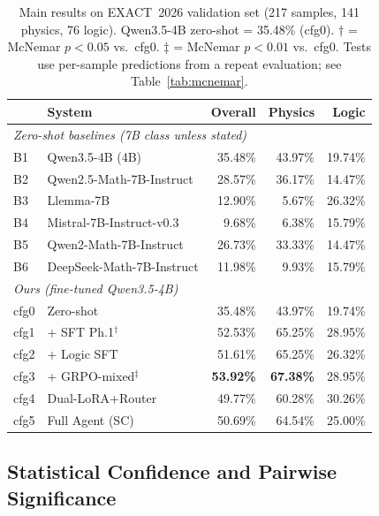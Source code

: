 \documentclass{ieeeaccess}
\newcommand{\basemodelname}{Qwen3.5-4B}
\newcommand{\dataset}{EXACT~2026}
\begin{document}
\begin{table}[t]
  \centering
  \caption{Main results on \dataset{} validation set (217 samples,
           141 physics, 76 logic).
           \basemodelname{} zero-shot = 35.48\% (cfg0).
           $\dagger$ = McNemar $p < 0.05$ vs.\ cfg0.
           $\ddagger$ = McNemar $p < 0.01$ vs.\ cfg0.
           Tests use per-sample predictions from a repeat evaluation;
           see Table~\ref{tab:mcnemar}.}
  \label{tab:main}
  \begin{tabular}{llrrr}
    \toprule
    & \textbf{System} & \textbf{Overall} & \textbf{Physics} & \textbf{Logic} \\
    \midrule
    \multicolumn{5}{l}{\textit{Zero-shot baselines (7B class unless stated)}} \\
    B1 & \basemodelname{} (4B) & 35.48\% & 43.97\% & 19.74\% \\
    B2 & Qwen2.5-Math-7B-Instruct  & 28.57\% & 36.17\% & 14.47\% \\
    B3 & Llemma-7B                 & 12.90\% &  5.67\% & 26.32\% \\
    B4 & Mistral-7B-Instruct-v0.3  &  9.68\% &  6.38\% & 15.79\% \\
    B5 & Qwen2-Math-7B-Instruct    & 26.73\% & 33.33\% & 14.47\% \\
    B6 & DeepSeek-Math-7B-Instruct & 11.98\% &  9.93\% & 15.79\% \\
    \midrule
    \multicolumn{5}{l}{\textit{Ours (fine-tuned \basemodelname{})}} \\
    cfg0 & Zero-shot      & 35.48\% & 43.97\% & 19.74\% \\
    cfg1 & + SFT Ph.1$^\dagger$       & 52.53\% & 65.25\% & 28.95\% \\
    cfg2 & + Logic SFT               & 51.61\% & 65.25\% & 26.32\% \\
    cfg3 & + GRPO-mixed$^\ddagger$    & \textbf{53.92\%} & \textbf{67.38\%} & 28.95\% \\
    cfg4 & Dual-LoRA+Router           & 49.77\% & 60.28\% & 30.26\% \\
    cfg5 & Full Agent (SC)            & 50.69\% & 64.54\% & 25.00\% \\
    \bottomrule
  \end{tabular}
\end{table}

\subsection{Statistical Confidence and Pairwise Significance}
\end{document}

